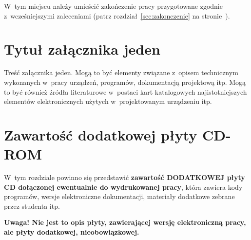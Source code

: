 \documentclass[skorowidz,skroty]{dyplomWEZUT}
\begin{document}
\begin{zakonczenie}\label{chap:zakonczenie}
W~tym miejscu należy umieścić zakończenie pracy przygotowane zgodnie z~wcześniejszymi zaleceniami (patrz rozdział~\ref{sec:zakonczenie} na stronie~\pageref{sec:zakonczenie}).
\end{zakonczenie}


\appendix

\chapter{Tytuł załącznika jeden}\label{chap:dodatek1}

Treść załącznika jeden. Mogą to być elementy związane z~opisem technicznym wykonanych w~pracy urządzeń, programów, dokumentacją projektową itp. Mogą to być również źródła literaturowe w~postaci kart katalogowych najistotniejszych elementów elektronicznych użytych w~projektowanym urządzeniu itp.

\chapter{Zawartość dodatkowej płyty CD-ROM}\label{chap:dodatkowyCD}

W~tym rozdziale powinno się przedstawić \textbf{zawartość DODATKOWEJ płyty CD dołączonej ewentualnie do wydrukowanej pracy}, która zawiera kody programów, wersje elektroniczne dokumentacji, materiały dodatkowe zebrane przez studenta itp.

\noindent\textbf{Uwaga! Nie jest to opis płyty, zawierającej wersję elektroniczną pracy, ale płyty dodatkowej, nieobowiązkowej.}


\printbibliography[heading=bibintoc]

\listoftables

\listoffigures

\listoflistings


\printindex
\end{document}
